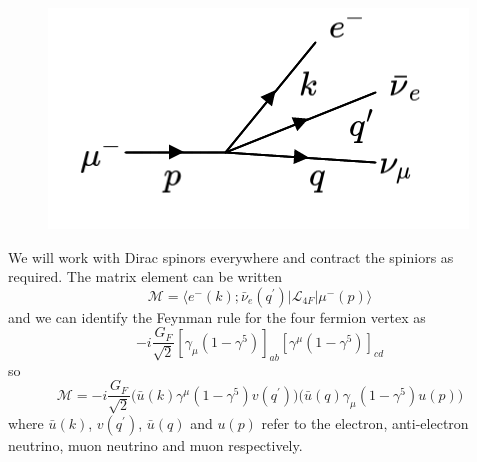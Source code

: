 \documentclass[a4paper,12pt]{article}
\begin{document}
\begin{figure}
  \centering
  \includegraphics[width=\linewidth]{figs/diag_1.png}
\end{figure}
We will work with Dirac spinors everywhere and contract the spiniors as required.
The matrix element can be written
\begin{equation}
  \mathcal{M} = \langle e^-(k);\bar{\nu}_e(q^\prime)|\mathcal{L}_{4F}|\mu^-(p) \rangle
\end{equation}
and we can identify the Feynman rule for the four fermion vertex as 
\begin{equation}
  -i\frac{G_F}{\sqrt{2}} [\gamma_\mu(1-\gamma^5)]_{ab} [\gamma^\mu(1-\gamma^5)]_{cd}
\end{equation}
so 
\begin{equation}
  \mathcal{M} = -i\frac{G_F}{\sqrt{2}} \bigg(\bar{u}(k)\gamma^\mu(1-\gamma^5)v(q^\prime)\bigg) \bigg(\bar{u}(q)\gamma_\mu(1-\gamma^5)u(p)\bigg)
\end{equation}
where $\bar{u}(k)$, $v(q^\prime)$, $\bar{u}(q)$ and $u(p)$ refer to the electron, anti-electron neutrino, muon neutrino and muon respectively. 
\end{document}
